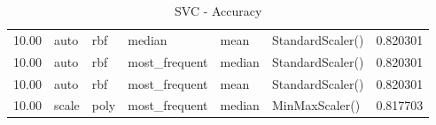 \documentclass[12pt,twoside]{report}
\begin{document}
\begin{table}[ht!]
\begin{center}
{\begin{tabular}{rlllllr}
  10.00 &       auto &         rbf &                          median &                            mean &  StandardScaler() &  0.820301 \\
  10.00 &       auto &         rbf &                   most\_frequent &                          median &  StandardScaler() &  0.820301 \\
  10.00 &       auto &         rbf &                   most\_frequent &                            mean &  StandardScaler() &  0.820301 \\
  10.00 &      scale &        poly &                   most\_frequent &                          median &    MinMaxScaler() &  0.817703 \\
\bottomrule
\end{tabular}
}
\end{center}
\caption{SVC - Accuracy}
\label{svc:table}
\end{table}
\end{document}
